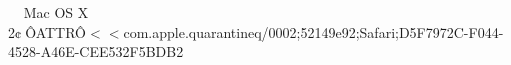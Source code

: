     Mac OS X            	   2   ¢      Ô                                      ATTR       Ô      <                     <  com.apple.quarantine q/0002;52149e92;Safari;D5F7972C-F044-4528-A46E-CEE532F5BDB2 